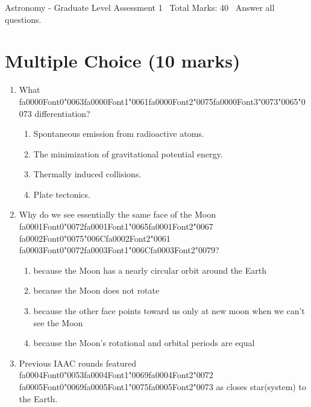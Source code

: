 \documentclass[12pt]{article}
\begin{document}
\begin{center}
Astronomy - Graduate Level Assessment 1 \
Total Marks: 40 \
Answer all questions.
\end{center}

\section*{Multiple Choice (10 marks)}
\begin{enumerate}[label=\arabic*.]
\item What {\csname fa0000Font0\endcsname\char"0063}{\csname fa0000Font1\endcsname\char"0061}{\csname fa0000Font2\endcsname\char"0075}{\csname fa0000Font3\endcsname\char"0073}{\char"0065}{\char"0073} differentiation?
\begin{enumerate}[label=(\alph*)]
    \item Spontaneous emission from radioactive atoms.
    \item The minimization of gravitational potential energy.
    \item Thermally induced collisions.
    \item Plate tectonics.
\end{enumerate}
\item Why do we see essentially the same face of the Moon {\csname fa0001Font0\endcsname\char"0072}{\csname fa0001Font1\endcsname\char"0065}{\csname fa0001Font2\endcsname\char"0067} {\csname fa0002Font0\endcsname\char"0075}{\char"006C}{\csname fa0002Font2\endcsname\char"0061} {\csname fa0003Font0\endcsname\char"0072}{\csname fa0003Font1\endcsname\char"006C}{\csname fa0003Font2\endcsname\char"0079}?
\begin{enumerate}[label=(\alph*)]
    \item because the Moon has a nearly circular orbit around the Earth
    \item because the Moon does not rotate
    \item because the other face points toward us only at new moon when we can't see the Moon
    \item because the Moon's rotational and orbital periods are equal
\end{enumerate}
\item Previous IAAC rounds featured {\csname fa0004Font0\endcsname\char"0053}{\csname fa0004Font1\endcsname\char"0069}{\csname fa0004Font2\endcsname\char"0072} {\csname fa0005Font0\endcsname\char"0069}{\csname fa0005Font1\endcsname\char"0075}{\csname fa0005Font2\endcsname\char"0073} as closes star(system) to the Earth.

\end{enumerate}
\end{document}
